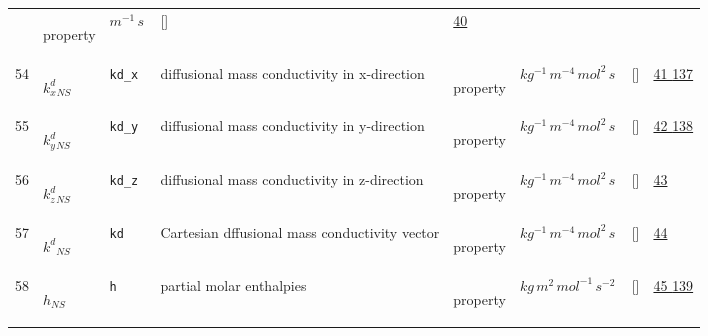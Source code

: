 \begin{longtable}{|p{1cm}|p{3cm}|p{3cm}|p{7cm}|p{3.0cm}|p{3cm}|p{2cm}|p{1cm}|}
             & \begin{lay}property \end{lay}
             & $ m^{-1} \,s \, $
             & []
             & \hyperlink{"e:40"}{ 40 }
                 \\
    54
             & \hypertarget{"v:54"}{ $ {k^d_x}{_{{N S}}} $}
             & \verb|kd_x|
             & diffusional mass conductivity in x-direction
             & \begin{lay}property \end{lay}
             & $ kg^{-1} \,m^{-4} \,mol^{2} \,s \, $
             & []
             & \hyperlink{"e:41"}{ 41 }
                 \hyperlink{"e:137"}{ 137 }
                 \\
    55
             & \hypertarget{"v:55"}{ $ {k^d_y}{_{{N S}}} $}
             & \verb|kd_y|
             & diffusional mass conductivity in y-direction
             & \begin{lay}property \end{lay}
             & $ kg^{-1} \,m^{-4} \,mol^{2} \,s \, $
             & []
             & \hyperlink{"e:42"}{ 42 }
                 \hyperlink{"e:138"}{ 138 }
                 \\
    56
             & \hypertarget{"v:56"}{ $ {k^d_z}{_{{N S}}} $}
             & \verb|kd_z|
             & diffusional mass conductivity in z-direction
             & \begin{lay}property \end{lay}
             & $ kg^{-1} \,m^{-4} \,mol^{2} \,s \, $
             & []
             & \hyperlink{"e:43"}{ 43 }
                 \\
    57
             & \hypertarget{"v:57"}{ $ {k^d}{_{{N S}}} $}
             & \verb|kd|
             & Cartesian dffusional mass conductivity vector
             & \begin{lay}property \end{lay}
             & $ kg^{-1} \,m^{-4} \,mol^{2} \,s \, $
             & []
             & \hyperlink{"e:44"}{ 44 }
                 \\
    58
             & \hypertarget{"v:58"}{ $ {h}{_{{N S}}} $}
             & \verb|h|
             & partial molar enthalpies
             & \begin{lay}property \end{lay}
             & $ kg \,m^{2} \,mol^{-1} \,s^{-2} \, $
             & []
             & \hyperlink{"e:45"}{ 45 }
                 \hyperlink{"e:139"}{ 139 }
                 \\

\end{longtable}
